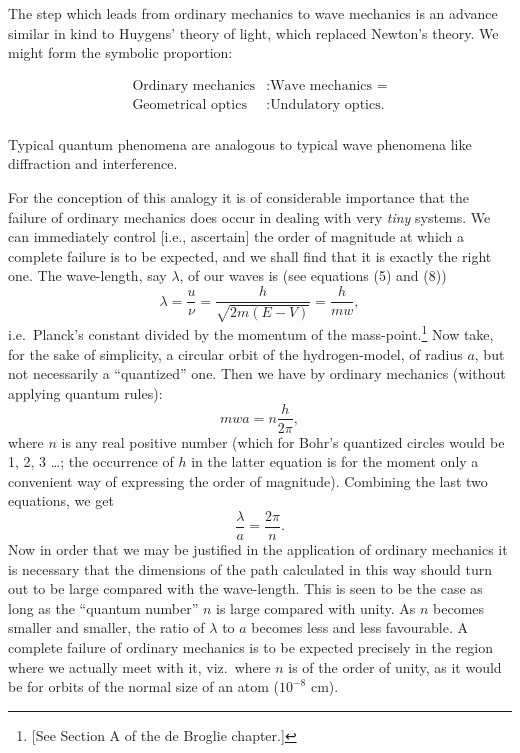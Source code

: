 The step which leads from ordinary mechanics to wave mechanics is an
advance similar in kind to Huygens' theory of light, which replaced
Newton's theory. We might form the symbolic proportion:
\begin{center}
\begin{align*}
\text{Ordinary mechanics} &: \text{Wave mechanics =}\\
\text{Geometrical optics} &: \text{Undulatory optics.}\\
\end{align*}
\end{center}
Typical quantum phenomena are analogous to typical wave phenomena like
diffraction and interference.

For the conception of this analogy it is of considerable importance that
the failure of ordinary mechanics does occur in dealing with very
\emph{tiny} systems. We can immediately control {[}i.e., ascertain{]}
the order of magnitude at which a complete failure is to be expected,
and we shall find that it is exactly the right one. The wave-length, say
$\lambda$, of our waves is (see equations (5) and (8))
\begin{equation}
\lambda = \frac{u}{\nu} = \frac{h}{\sqrt{2m(E-V)}} = \frac{h}{mw} ,
\end{equation}
i.e.\ Planck's constant divided by the momentum of the
mass-point.\footnote{{[}See Section A of the de Broglie chapter.{]}} Now take, for
the sake of simplicity, a circular orbit of the hydrogen-model, of
radius $a$, but not necessarily a ``quantized'' one. Then we have
by ordinary mechanics (without applying quantum rules):
\begin{equation*}
mwa = n\frac{h}{2\pi} , 
\end{equation*}
where $n$ is any real positive number (which for Bohr's quantized
circles would be 1, 2, 3 \ldots ; the occurrence of $h$ in the
latter equation is for the moment only a convenient way of expressing
the order of magnitude). Combining the last two equations, we get
\begin{equation*}
\frac{\lambda}{a} = \frac{2\pi}{n}.
\end{equation*}
Now in order that we may be justified in the application of ordinary
mechanics it is necessary that the dimensions of the path calculated in
this way should turn out to be large compared with the wave-length. This
is seen to be the case as long as the ``quantum number'' $n$ is
large compared with unity. As $n$ becomes smaller and smaller, the
ratio of $\lambda$ to $a$ becomes less and less favourable. A
complete failure of ordinary mechanics is to be expected precisely in
the region where we actually meet with it, viz.\ where $n$ is of the
order of unity, as it would be for orbits of the normal size of an atom
($10^{-8}$ cm).

